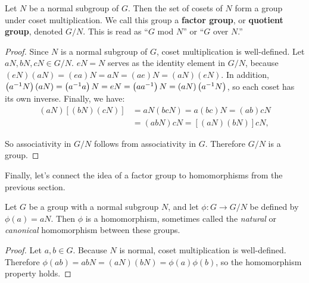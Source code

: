 \begin{theorem}
Let $N$ be a normal subgroup of $G$. Then the set of cosets of $N$ form a group under coset multiplication. We call this group a \textbf{factor group}, or \textbf{quotient group}, denoted $G/N$. This is read as ``$G$ mod $N$'' or ``$G$ over $N$.''
\end{theorem}

\begin{proof}
Since $N$ is a normal subgroup of $G$, coset multiplication is well-defined. Let $aN, bN, cN \in G/N$. $eN = N$ serves as the identity element in $G/N$, because $(eN)(aN) = (ea)N = aN = (ae)N = (aN)(eN)$. In addition, $\left(a^{-1} N\right)(aN) = \left(a^{-1} a\right)N = eN = \left(a a^{-1}\right)N = (aN)\left(a^{-1} N\right)$, so each coset has its own inverse. Finally, we have:
\begin{align*}
    (aN)\left[(bN)(cN)\right] &= aN(bcN) = a(bc)N = (ab)cN \\
    &= (abN)cN = \left[(aN)(bN)\right]cN,
\end{align*}

So associativity in $G/N$ follows from associativity in $G$. Therefore $G/N$ is a group.

\end{proof}

Finally, let's connect the idea of a factor group to homomorphisms from the previous section.

\begin{theorem}
Let $G$ be a group with a normal subgroup $N$, and let $\phi: G \to G/N$ be defined by $\phi(a) = aN$. Then $\phi$ is a homomorphism, sometimes called the \textit{natural} or \textit{canonical} homomorphism between these groups.
\end{theorem}

\begin{proof}
Let $a, b \in G$. Because $N$ is normal, coset multiplication is well-defined. Therefore $\phi(ab) = abN = (aN)(bN) = \phi(a)\phi(b)$, so the homomorphism property holds.
\end{proof}